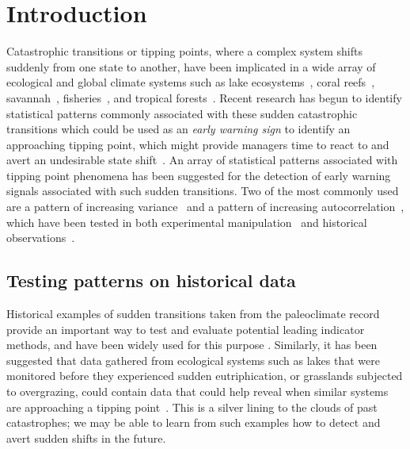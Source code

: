\documentclass[authoryear,review,12pt]{elsarticle}
\begin{document}
\section{Introduction}


Catastrophic transitions or tipping points, where a complex system
shifts suddenly from one state to another, have been implicated in
a wide array of ecological and global climate systems such as lake
ecosystems~\citep{Carpenter2011}, coral reefs~\citep{Mumby2007},
savannah~\citep{Kefi2007}, fisheries~\citep{Berkes2006}, and tropical
forests~\citep{Hirota2011}.  Recent research has begun to identify
statistical patterns commonly associated with these sudden catastrophic
transitions which could be used as an \emph{early warning sign} to
identify an approaching tipping point, which might provide managers time
to react to and avert an undesirable state shift~\citep{Scheffer2009,
Lenton2011}.  An array of statistical patterns associated with tipping
point phenomena has been suggested for the detection of early warning
signals associated with such sudden transitions.  Two of the most commonly
used are a pattern of increasing variance~\citep{Carpenter2006} and a
pattern of increasing autocorrelation~\citep{vanNes2007}, which have
been tested in both experimental manipulation~\citep{Drake2010,
Carpenter2011, Veraart2011} and historical
observations~\citep{Livina2007,Dakos2008,Lenton2012,Ditlevsen2010,Guttal2008,Thompson2010}.


\subsection*{Testing patterns on historical data}

Historical examples of sudden transitions taken from the paleoclimate
record provide an important way to test and evaluate potential
leading indicator methods, and have been widely used for this purpose
\citep{Livina2007,Dakos2008,Lenton2012,Ditlevsen2010,Guttal2008,Thompson2010}.
Similarly, it has been suggested that data gathered from ecological
systems such as lakes that were monitored before they experienced sudden
eutriphication, or grasslands subjected to overgrazing, could contain
data that could help reveal when similar systems are approaching a
tipping point~\citep{Carpenter2011}.  This is a silver lining to the
clouds of past catastrophes; we may be able to learn from such examples 
how to detect and avert sudden shifts in the future.
\end{document}

